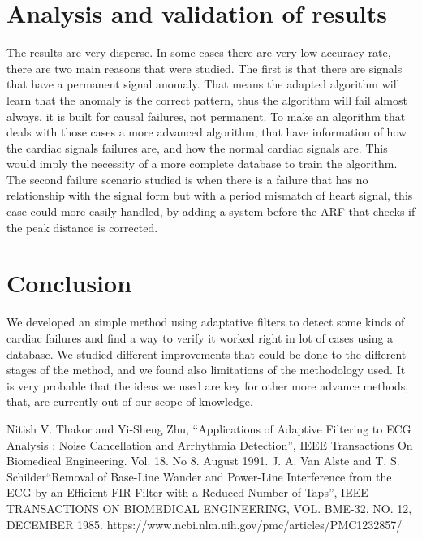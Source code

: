 \documentclass[conference]{IEEEtran}
\begin{document}
\section{Analysis and validation of results}
The results are very disperse. In some cases there are very low accuracy rate, there are two main reasons that were studied. The first is that there are signals that have a permanent signal anomaly. That means the adapted algorithm will learn that the anomaly is the correct pattern, thus the algorithm will fail almost always, it is built for causal failures, not permanent. To make an algorithm that deals with those cases a more advanced algorithm, that have information of how the cardiac signals failures are, and how the normal cardiac signals are. This would imply the necessity of a more complete database to train the algorithm. The second failure scenario studied is when there is a failure that has no relationship with the signal form but with a period mismatch of heart signal, this case could more easily handled, by adding a system before the ARF that checks if the peak distance is corrected. 

\section{Conclusion}
We developed an simple method using adaptative filters to detect some kinds of cardiac failures and find a way to verify it worked right in lot of cases using a database. We studied different improvements that could be done to the different stages of the method, and we found also limitations of the methodology used. It is very probable that the ideas we used are key for other more advance methods, that, are currently out of our scope of knowledge.

\begin{thebibliography}{00}
 Nitish V. Thakor and Yi-Sheng Zhu, ``Applications of Adaptive Filtering to ECG Analysis :
Noise Cancellation and Arrhythmia Detection'', IEEE Transactions On Biomedical Engineering. Vol. 18. No 8. August 1991.
 J. A. Van Alste and T. S. Schilder``Removal of Base-Line Wander and Power-Line Interference from the ECG by an Efficient FIR Filter with a Reduced Number of Taps'', IEEE TRANSACTIONS ON BIOMEDICAL ENGINEERING, VOL. BME-32, NO. 12, DECEMBER 1985.
 https://www.ncbi.nlm.nih.gov/pmc/articles/PMC1232857/
\end{thebibliography}
\end{document}
